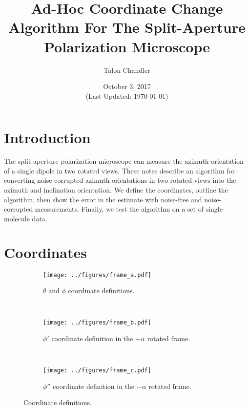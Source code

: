 \documentclass[11pt]{article}
\begin{document}
\title{\vspace{-2.5em} Ad-Hoc Coordinate Change Algorithm For The Split-Aperture\\
  Polarization Microscope \vspace{-1em}} \author{Talon
  Chandler}%
\date{\vspace{-1em}October 3, 2017\\(Last Updated: \today)\vspace{-1em}}
\maketitle
\section{Introduction}
The split-aperture polarization microscope can measure the azimuth orientation
of a single dipole in two rotated views. These notes describe an algorithm for
converting noise-corrupted azimuth orientations in two rotated views into the
azimuth and inclination orientation. We define the coordinates, outline the
algorithm, then show the error in the estimate with noise-free and noise-corrupted
measurements. Finally, we test the algorithm on a set of single-molecule data. 

\section{Coordinates}
\begin{figure*}[h]
 \captionsetup{width=1.0\linewidth}
 \centering
 \begin{subfigure}[t]{0.33\textwidth}
   \centering
   \texttt{[image: ../figures/frame\_a.pdf]}
   \caption{$\theta$ and $\phi$ coordinate definitions.}
   \label{fig:frames_a}
 \end{subfigure}%
 ~
 \begin{subfigure}[t]{0.33\textwidth}
   \centering
   \texttt{[image: ../figures/frame\_b.pdf]}
   \caption{$\phi'$ coordinate definition in the $+\alpha$ rotated frame.}
   \label{fig:frames_b}
 \end{subfigure}%
 ~
 \begin{subfigure}[t]{0.33\textwidth}
   \centering
   \texttt{[image: ../figures/frame\_c.pdf]}
   \caption{$\phi''$ coordinate definition in the $-\alpha$ rotated frame.}
   \label{fig:frames_c}
 \end{subfigure}%
 \caption{Coordinate definitions.}
 \label{fig:frames}
\end{figure*}
\end{document}
